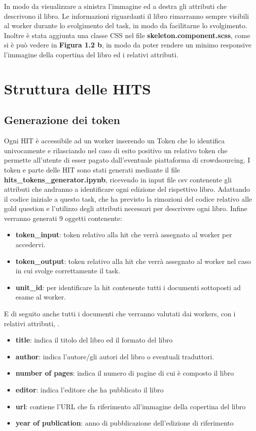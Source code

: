 \documentclass[a4paper,11pt]{report}
\begin{document}
In modo da visualizzare a sinistra l'immagine ed a destra gli attributi che descrivono il libro.
Le informazioni riguardanti il libro rimarranno sempre visibili al worker durante lo svolgimento del task, in modo da facilitarne lo svolgimento. \newline Inoltre è stata aggiunta una classe CSS nel file \textbf{skeleton.component.scss}, come si è può vedere in \textbf{Figura 1.2 b}, in modo da poter rendere un minimo responsive l'immagine della copertina del libro ed i relativi attributi.

\section{Struttura delle HITS}
\subsection{Generazione dei token}
Ogni HIT è accessibile ad un worker inserendo un Token che lo identifica univocamente e rilasciando nel caso di esito positivo un relativo token che permette all'utente di esser pagato dall'eventuale piattaforma di crowdsourcing.
I token e parte delle HIT sono stati generati mediante il file \textbf{hits\_tokens\_generator.ipynb}, ricevendo in input file csv contenente gli attributi che andranno a identificare ogni edizione del rispettivo libro. Adattando il codice iniziale a questo task, che ha previsto la rimozioni del codice relativo alle gold question e l'utilizzo degli attributi necessari per descrivere ogni libro. Infine verranno generati 9 oggetti contenente:
\begin{itemize}
	\item \textbf{token\_input}: token relativo alla hit che verrà assegnato al worker per accedervi.
	\item \textbf{token\_output}: token relativo alla hit che verrà assegnato al worker nel caso in cui svolge correttamente il task.
	\item \textbf{unit\_id}: per identificare la hit contenente tutti i documenti sottoposti ad esame al worker.
\end{itemize}
 E di seguito anche tutti i documenti che verranno valutati dai workers, con i relativi attributi, .
\begin{itemize}
	\item \textbf{title}: indica il titolo del libro ed il formato del libro
	\item \textbf{author}: indica l'autore/gli autori del libro o eventuali traduttori.
	\item \textbf{number of pages}: indica il numero di pagine di cui è composto il libro
	\item \textbf{editor}: indica l'editore che ha pubblicato il libro
	\item \textbf{url}: contiene l'URL che fa riferimento all'immagine della copertina del libro
	\item \textbf{year of publication}: anno di pubblicazione dell'edizione di riferimento
\end{itemize}
\end{document}
